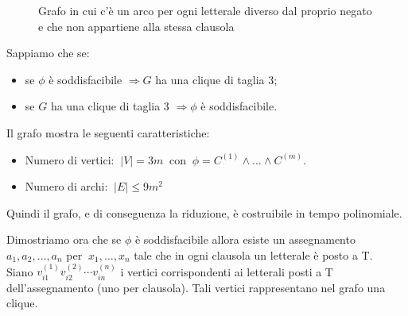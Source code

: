 \documentclass[a4paper]{article}
\theoremstyle{definition}
\begin{document}
		\begin{figure}[h!]
			\centering
			\caption{Grafo in cui c'è un arco per ogni letterale diverso dal proprio negato e che non appartiene alla stessa clausola}
		\end{figure}
	
	\noindent
	Sappiamo che se:
	\begin{itemize}
		\item se $\phi$ è soddisfacibile $\Rightarrow G$ ha una clique di taglia 3;
		\item se $G$ ha una clique di taglia 3 $\Rightarrow \phi$ è soddisfacibile.
	\end{itemize}		
		\noindent
		Il grafo mostra le seguenti caratteristiche:
		\begin{itemize}
			\item Numero di vertici: $\ \vert V \vert = 3m \ $ con $ \ \phi = C^{(1)}\wedge\dots\wedge C^{(m)} $.
			\item Numero di archi: $ \ \vert E \vert \leq 9m^2 $
		\end{itemize}
		Quindi il grafo, e di conseguenza la riduzione, è costruibile in tempo polinomiale.
		
		\bigskip
		
		Dimostriamo ora che se $ \phi $ è soddisfacibile allora esiste un assegnamento $ a_1, a_2,\dots, a_n $ per $\ x_1, \dots, x_n $ tale che in ogni clausola un letterale è posto a T.\\
		Siano $ v_{i1}^{(1)} v_{i2}^{(2)}\cdots v_{in}^{(n)} $ i vertici corrispondenti ai letterali posti a T dell'assegnamento (uno per clausola). Tali vertici rappresentano nel grafo una clique.
		
\end{document}
